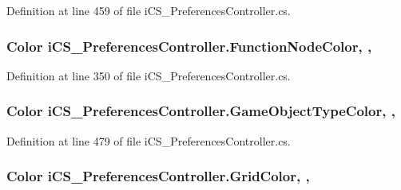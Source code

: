 Definition at line 459 of file i\+C\+S\+\_\+\+Preferences\+Controller.\+cs.

\hypertarget{classi_c_s___preferences_controller_a60c3ad475e34e81d188a49d67693dc3b}{
\subsubsection[{Function\+Node\+Color}]{\setlength{\rightskip}{0pt plus 5cm}Color i\+C\+S\+\_\+\+Preferences\+Controller.\+Function\+Node\+Color\hspace{0.3cm}{\ttfamily [static]}, {\ttfamily [get]}, {\ttfamily [set]}}}\label{classi_c_s___preferences_controller_a60c3ad475e34e81d188a49d67693dc3b}


Definition at line 350 of file i\+C\+S\+\_\+\+Preferences\+Controller.\+cs.

\hypertarget{classi_c_s___preferences_controller_ad80951e5cf9555ebbcaea0d1f8104b54}{
\subsubsection[{Game\+Object\+Type\+Color}]{\setlength{\rightskip}{0pt plus 5cm}Color i\+C\+S\+\_\+\+Preferences\+Controller.\+Game\+Object\+Type\+Color\hspace{0.3cm}{\ttfamily [static]}, {\ttfamily [get]}, {\ttfamily [set]}}}\label{classi_c_s___preferences_controller_ad80951e5cf9555ebbcaea0d1f8104b54}


Definition at line 479 of file i\+C\+S\+\_\+\+Preferences\+Controller.\+cs.

\hypertarget{classi_c_s___preferences_controller_a2cc29670a09e851f35c695810a3d0a73}{
\subsubsection[{Grid\+Color}]{\setlength{\rightskip}{0pt plus 5cm}Color i\+C\+S\+\_\+\+Preferences\+Controller.\+Grid\+Color\hspace{0.3cm}{\ttfamily [static]}, {\ttfamily [get]}, {\ttfamily [set]}}}\label{classi_c_s___preferences_controller_a2cc29670a09e851f35c695810a3d0a73}


